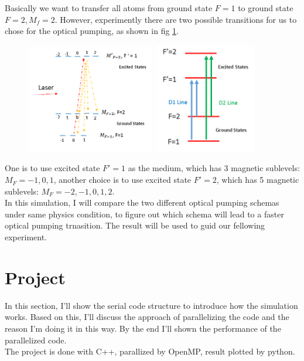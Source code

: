 \documentclass[a4paper, 10pt]{article}
\begin{document}
Basically we want to transfer all atoms from ground state $F=1$ to ground state $F=2, M_f = 2$. However, experimently there are two possible transitions for us to chose for the optical pumping, as shown in fig \ref{fig2}. \\ %
\begin{figure}[!h]
  \centering
  \caption{}
  \includegraphics[width = 0.5\textwidth]{fig2}
  \includegraphics[width = 0.4\textwidth]{fig4}
  \label{fig2}
\end{figure}

One is to use excited state $F\prime = 1$ as the medium, which has 3 magnetic sublevels: $M_F = -1, 0, 1$, another choice is to use excited state $F\prime = 2$, which has 5 magnetic sublevels: $M_F = -2, -1, 0, 1, 2$. \\

In this simulation, I will compare the two different optical pumping schemas under same physics condition, to figure out which schema will lead to a faster optical pumping trnasition. The result will be used to guid our fellowing experiment. 

\section{Project}
In this section, I'll show the serial code structure to introduce how the simulation works. Based on this, I'll discuss the approach of parallelizing the code and the reason I'm doing it in this way. By the end I'll shown the performance of the parallelized code. \\
The project is done with C++, parallized by OpenMP, result plotted by python. 
\end{document}
